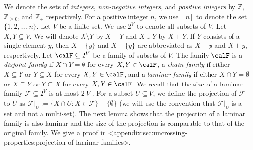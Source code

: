 \documentclass{article}
\def\Cref#1{<#1>}%
\newcommand{\indicator}{\ensuremath{\mathbbm{1}}\xspace}
\newcommand{\shubhang}[1]{{\color{blue}[{\tiny Shubhang: \bf #1}]\marginpar{\color{blue}*}}}
\newcommand{\knote}[1]{{\color{red}[{\tiny Karthik: \bf #1}]\marginpar{\color{red}*}}}
\begin{document}

We denote the sets of 
\emph{integers}, \emph{non-negative integers}, and \emph{positive integers} by 
$\mathbb{Z}$, $\mathbb{Z}_{\geq 0}$, and $\mathbb{Z}_+$ respectively. For a positive integer $n$, we use $[n]$ to denote the set $\{1, 2, \ldots, n\}$. %
Let $V$ be a finite set. We use $2^{V}$ to denote all subsets of $V$. 
Let $X, Y\subseteq V$. We will denote $X\setminus Y$ by $X-Y$ and $X\cup Y$ by $X+Y$. If $Y$ consists of a single element $y$, then $X-\{y\}$ and $X+\{y\}$ are abbreviated as $X-y$ and $X+y$, respectively. 
Let $\calF\subseteq 2^V$ be a family of subsets of $V$. 
The family $\calF$ is 
a \emph{disjoint family} if $X\cap Y=\emptyset$ for every $X, Y\in \calF$, 
a \emph{chain family} if either $X\subseteq Y$ or $Y\subseteq X$ for every $X, Y\in \calF$, and a \emph{laminar family} if either $X\cap Y=\emptyset$ or $X\subseteq Y$ or $Y\subseteq X$ for every $X, Y\in \calF$. 
We recall that the size of a laminar family $\mathcal{F}\subseteq 2^V$ is at most $2|V|$. 
For a subset $U\subseteq V$, we define the projection of $\mathcal{F}$ to $U$ as   $\mathcal{F}|_U:=\{X\cap U: X\in \mathcal{F}\}-\{\emptyset\}$ (we will use the convention that $\mathcal{F}|_U$ is a set and not a multi-set). 
The next lemma shows that the projection of a laminar family is also laminar and the size of the projection is comparable to that of the original family. We give a proof in \Cref{appendix:sec:uncrossing-properties:projection-of-laminar-families}.  %
\end{document}

